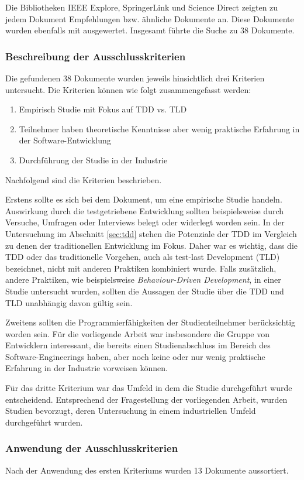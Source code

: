 Die Bibliotheken IEEE Explore, SpringerLink und Science Direct zeigten zu jedem Dokument Empfehlungen bzw. ähnliche Dokumente an. Diese Dokumente wurden ebenfalls mit ausgewertet. Insgesamt führte die Suche zu 38 Dokumente.

\subsubsection{Beschreibung der Ausschlusskriterien} Die gefundenen 38 Dokumente wurden jeweils hinsichtlich drei Kriterien untersucht. Die Kriterien können wie folgt zusammengefasst werden:
\begin{enumerate}[i]
\item Empirisch Studie mit Fokus auf TDD vs. TLD
\item Teilnehmer haben theoretische Kenntnisse aber wenig praktische Erfahrung in der Software-Entwicklung
\item Durchführung der Studie in der Industrie
\end{enumerate}
Nachfolgend sind die Kriterien beschrieben.

Erstens sollte es sich bei dem Dokument, um eine empirische Studie handeln. Auswirkung durch die testgetriebene Entwicklung sollten beispielsweise durch Versuche, Umfragen oder Interviews belegt oder widerlegt worden sein. In der Untersuchung im Abschnitt \ref{sec:tdd} stehen die Potenziale der TDD im Vergleich zu denen der traditionellen Entwicklung im Fokus. Daher war es wichtig, dass die TDD oder das traditionelle Vorgehen, auch als test-last Development (TLD) bezeichnet, nicht mit anderen Praktiken kombiniert wurde. Falls zusätzlich, andere Praktiken, wie beispielsweise \textit{Behaviour-Driven Development}, in einer Studie untersucht wurden, sollten die Aussagen der Studie über die TDD und TLD unabhängig davon gültig sein.

Zweitens sollten die Programmierfähigkeiten der Studienteilnehmer berücksichtig worden sein. Für die vorliegende Arbeit war insbesondere die Gruppe von Entwicklern interessant, die bereits einen Studienabschluss im Bereich des Software-Engineerings haben, aber noch keine oder nur wenig praktische Erfahrung in der Industrie vorweisen können.

Für das dritte Kriterium war das Umfeld in dem die Studie durchgeführt wurde entscheidend. Entsprechend der Fragestellung der vorliegenden Arbeit, wurden Studien bevorzugt, deren Untersuchung in einem industriellen Umfeld durchgeführt wurden.

\subsubsection{Anwendung der Ausschlusskriterien} Nach der Anwendung des ersten Kriteriums wurden 13 Dokumente aussortiert.


